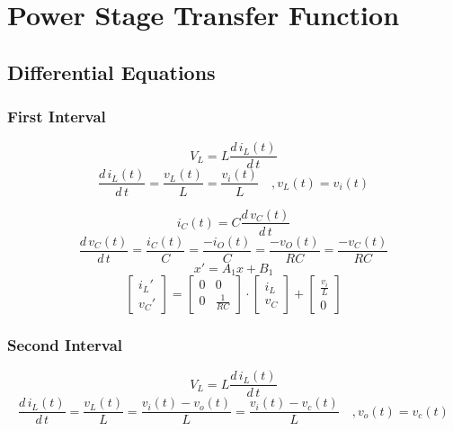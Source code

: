 \section{Power Stage Transfer Function}

\subsection{Differential Equations}
\subsubsection{First Interval}
\[ 
	V_L
	= L \frac{d\,i_L(t)}{d\,t}
\]
\[
	\frac{d\,i_L(t)}{d\,t}
	= \frac{v_L(t)}{L}
	= \frac{v_i(t)}{L}
	\quad, v_L(t) = v_i(t)
\]

\[
	i_C(t) 
	= C \frac{d\,v_C(t)}{d\,t}
\]
\[
	\frac{d\,v_C(t)}{d\,t}
	= \frac{i_C(t)}{C}
	= \frac{-i_O(t)}{C}
	= \frac{-v_O(t)}{R C}
	= \frac{-v_C(t)}{R C}
\]
\[
	x' = A_1 x + B_1
\]
\[
	\begin{bmatrix}
		{i_L}' \\
		{v_C}'
	\end{bmatrix}
	=
	\begin{bmatrix}
		0 	& 0 \\
		0	& \frac{1}{R C}
	\end{bmatrix}
	\cdot
	\begin{bmatrix}
		i_L \\
		v_C
	\end{bmatrix}
	+
	\begin{bmatrix}
		\frac{v_i}{L} \\
		0
	\end{bmatrix}
\]

\subsubsection{Second Interval}
\[ 
	V_L
	= L \frac{d\,i_L(t)}{d\,t}
\]
\[
	\frac{d\,i_L(t)}{d\,t}
	= \frac{v_L(t)}{L}
	= \frac{v_i(t) - v_o(t)}{L}
	= \frac{v_i(t) - v_c(t)}{L}
	\quad, v_o(t) = v_c(t)
\]

